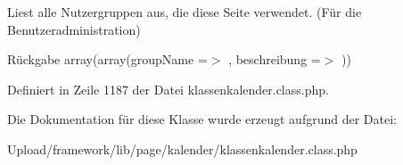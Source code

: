 Liest alle Nutzergruppen aus, die diese Seite verwendet. (Für die Benutzeradministration) \begin{DoxyReturn}{Rückgabe}
array(array(\textquotesingle{}group\+Name\textquotesingle{} =$>$ \textquotesingle{}\textquotesingle{}, \textquotesingle{}beschreibung\textquotesingle{} =$>$ \textquotesingle{}\textquotesingle{})) 
\end{DoxyReturn}


Definiert in Zeile 1187 der Datei klassenkalender.\+class.\+php.



Die Dokumentation für diese Klasse wurde erzeugt aufgrund der Datei\+:\begin{DoxyCompactItemize}
\item 
Upload/framework/lib/page/kalender/klassenkalender.\+class.\+php\end{DoxyCompactItemize}

